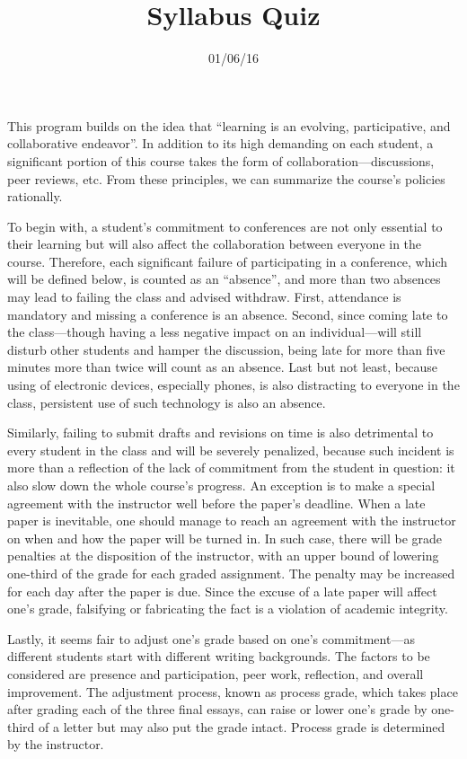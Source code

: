 \documentclass{writing}
\title{Syllabus Quiz}
\date{01/06/16}
\begin{document}
\maketitle

This program builds on the idea that “learning is an evolving, participative, and collaborative endeavor”. In addition to its high demanding on each student, a significant portion of this course takes the form of collaboration—discussions, peer reviews, etc. From these principles, we can summarize the course’s policies rationally.

To begin with, a student’s commitment to conferences are not only essential to their learning but will also affect the collaboration between everyone in the course. Therefore, each significant failure of participating in a conference, which will be defined below, is counted as an “absence”, and more than two absences may lead to failing the class and advised withdraw. First, attendance is mandatory and missing a conference is an absence. Second, since coming late to the class—though having a less negative impact on an individual—will still disturb other students and hamper the discussion, being late for more than five minutes more than twice will count as an absence. Last but not least, because using of electronic devices, especially phones, is also distracting to everyone in the class, persistent use of such technology is also an absence.

Similarly, failing to submit drafts and revisions on time is also detrimental to every student in the class and will be severely penalized, because such incident is more than a reflection of the lack of commitment from the student in question: it also slow down the whole course’s progress. An exception is to make a special agreement with the instructor well before the paper’s deadline. When a late paper is inevitable, one should manage to reach an agreement with the instructor on when and how the paper will be turned in. In such case, there will be grade penalties at the disposition of the instructor, with an upper bound of lowering one-third of the grade for each graded assignment. The penalty may be increased for each day after the paper is due. Since the excuse of a late paper will affect one’s grade, falsifying or fabricating the fact is a violation of academic integrity.

Lastly, it seems fair to adjust one’s grade based on one’s commitment—as different students start with different writing backgrounds. The factors to be considered are presence and participation, peer work, reflection, and overall improvement. The adjustment process, known as process grade, which takes place after grading each of the three final essays, can raise or lower one’s grade by one-third of a letter but may also put the grade intact. Process grade is determined by the instructor.
\end{document}
